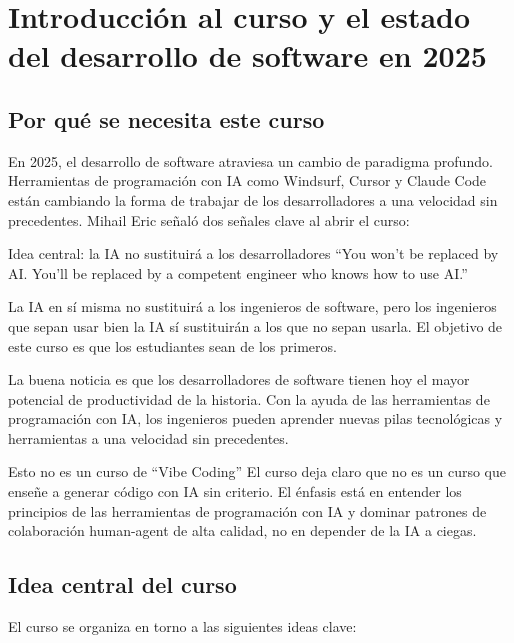 \section{Introducción al curso y el estado del desarrollo de software en 2025}

\subsection{Por qué se necesita este curso}

En 2025, el desarrollo de software atraviesa un cambio de paradigma profundo. Herramientas de programación con IA como Windsurf, Cursor y Claude Code están cambiando la forma de trabajar de los desarrolladores a una velocidad sin precedentes. Mihail Eric señaló dos señales clave al abrir el curso:

\begin{importantbox}{Idea central: la IA no sustituirá a los desarrolladores}
``You won't be replaced by AI. You'll be replaced by a competent engineer who knows how to use AI.''

La IA en sí misma no sustituirá a los ingenieros de software, pero los ingenieros que sepan usar bien la IA sí sustituirán a los que no sepan usarla. El objetivo de este curso es que los estudiantes sean de los primeros.
\end{importantbox}

La buena noticia es que los desarrolladores de software tienen hoy el mayor potencial de productividad de la historia. Con la ayuda de las herramientas de programación con IA, los ingenieros pueden aprender nuevas pilas tecnológicas y herramientas a una velocidad sin precedentes.

\begin{warningbox}{Esto no es un curso de ``Vibe Coding''}
El curso deja claro que no es un curso que enseñe a generar código con IA sin criterio. El énfasis está en entender los principios de las herramientas de programación con IA y dominar patrones de colaboración human-agent de alta calidad, no en depender de la IA a ciegas.
\end{warningbox}

\subsection{Idea central del curso}

El curso se organiza en torno a las siguientes ideas clave:

